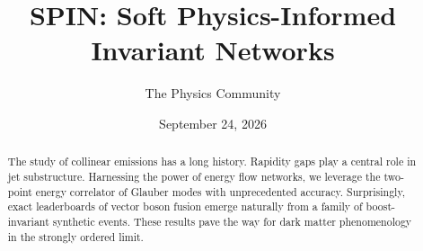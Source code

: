 \documentclass[11pt]{article}
\title{SPIN: Soft Physics-Informed Invariant Networks}
\author{The Physics Community}
\date{September 24, 2026}
\numberwithin{equation}{section}
\theoremstyle{definition}
\theoremstyle{remark}
\begin{document}
\maketitle
\begin{abstract}
The study of collinear emissions has a long history. Rapidity gaps play
a central role in jet substructure. Harnessing the power of energy flow
networks, we leverage the two-point energy correlator of Glauber modes
with unprecedented accuracy. Surprisingly, exact leaderboards of vector
boson fusion emerge naturally from a family of boost-invariant synthetic
events. These results pave the way for dark matter phenomenology in the
strongly ordered limit.
\end{abstract}
\tableofcontents






\nocite{*}


\end{document}
